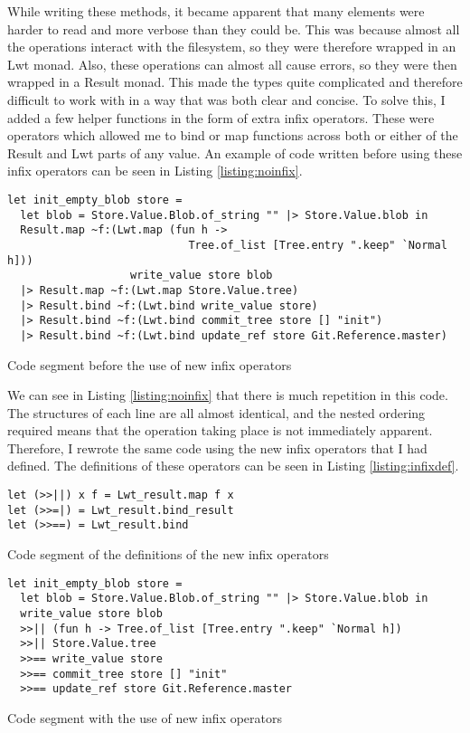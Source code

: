 While writing these methods, it became apparent that many elements were harder to read and more verbose than they could be. This was because almost all the operations interact with the filesystem, so they were therefore wrapped in an Lwt monad. Also, these operations can almost all cause errors, so they were then wrapped in a Result monad. This made the types quite complicated and therefore difficult to work with in a way that was both clear and concise. To solve this, I added a few helper functions in the form of extra infix operators. These were operators which allowed me to bind or map functions across both or either of the Result and Lwt parts of any value. An example of code written before using these infix operators can be seen in Listing \ref{listing:noinfix}.

\begin{listing}[h]
\begin{verbatim}
let init_empty_blob store =
  let blob = Store.Value.Blob.of_string "" |> Store.Value.blob in
  Result.map ~f:(Lwt.map (fun h ->
                            Tree.of_list [Tree.entry ".keep" `Normal h]))
                   write_value store blob
  |> Result.map ~f:(Lwt.map Store.Value.tree)
  |> Result.bind ~f:(Lwt.bind write_value store)
  |> Result.bind ~f:(Lwt.bind commit_tree store [] "init")
  |> Result.bind ~f:(Lwt.bind update_ref store Git.Reference.master)
\end{verbatim}
\caption{Code segment before the use of new infix operators}
\label{listing:noinfix}
\end{listing}

We can see in Listing \ref{listing:noinfix} that there is much repetition in this code. The structures of each line are all almost identical, and the nested ordering required means that the operation taking place is not immediately apparent. Therefore, I rewrote the same code using the new infix operators that I had defined. The definitions of these operators can be seen in Listing \ref{listing:infixdef}.

\begin{listing}[h]
\begin{verbatim}
let (>>||) x f = Lwt_result.map f x
let (>>=|) = Lwt_result.bind_result
let (>>==) = Lwt_result.bind
\end{verbatim}
\caption{Code segment of the definitions of the new infix operators}
\label{listing:infixdef}
\end{listing}

\begin{listing}[h]
\begin{verbatim}
let init_empty_blob store =
  let blob = Store.Value.Blob.of_string "" |> Store.Value.blob in
  write_value store blob
  >>|| (fun h -> Tree.of_list [Tree.entry ".keep" `Normal h])
  >>|| Store.Value.tree
  >>== write_value store
  >>== commit_tree store [] "init"
  >>== update_ref store Git.Reference.master
\end{verbatim}
\caption{Code segment with the use of new infix operators}
\label{listing:infix}
\end{listing}

